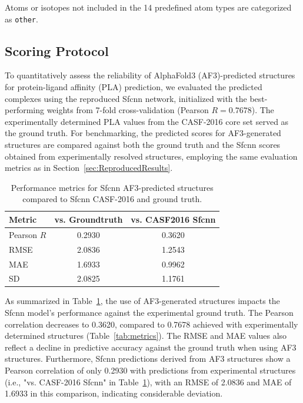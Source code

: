 \documentclass[unnumsec,webpdf,contemporary,large]{oup-authoring-template}
\theoremstyle{thmstyleone}%
\theoremstyle{thmstyletwo}%
\theoremstyle{thmstylethree}%
\begin{document}
Atoms or isotopes not included in the 14 predefined atom types are 
categorized as \texttt{other}.

\subsection{Scoring Protocol}
To quantitatively assess the reliability of AlphaFold3 (AF3)-predicted structures 
for protein-ligand affinity (PLA) prediction, we evaluated the predicted complexes 
using the reproduced Sfcnn network, initialized with the best-performing weights from 
7-fold cross-validation (Pearson $R = 0.7678$). The experimentally determined PLA values from the 
CASF-2016 core set served as the ground truth. 
For benchmarking, the predicted scores for AF3-generated structures are compared 
against both the ground truth and the Sfcnn scores obtained from experimentally 
resolved structures, employing the same evaluation metrics as 
in Section~\ref{sec:ReproducedResults}.

\begin{table}[H]
\centering
\caption{Performance metrics for Sfcnn AF3-predicted structures compared to Sfcnn CASF-2016 and ground truth.}
\label{tab:af3_metrics}
\begin{tabular}{lcc}
\toprule
Metric & vs. Groundtruth & vs.  CASF2016 Sfcnn\\
\midrule
Pearson $R$ & 0.2930 & 0.3620 \\
RMSE        & 2.0836 & 1.2543 \\
MAE         & 1.6933 & 0.9962 \\
SD          & 2.0825 & 1.1761 \\
\bottomrule
\end{tabular}
\end{table}

As summarized in Table~\ref{tab:af3_metrics}, 
the use of AF3-generated structures impacts the Sfcnn model's performance against the experimental ground truth. 
The Pearson correlation decreases to 0.3620, compared to 0.7678 achieved with experimentally determined structures (Table~\ref{tab:metrics}). 
The RMSE and MAE values also reflect a decline in predictive accuracy against the ground truth when using AF3 structures. 
Furthermore, Sfcnn predictions derived from AF3 structures show a Pearson correlation of only 0.2930 
with predictions from experimental structures (i.e., "vs. CASF-2016 Sfcnn" in Table~\ref{tab:af3_metrics}), 
with an RMSE of 2.0836 and MAE of 1.6933 in this comparison, indicating considerable deviation.
\end{document}

